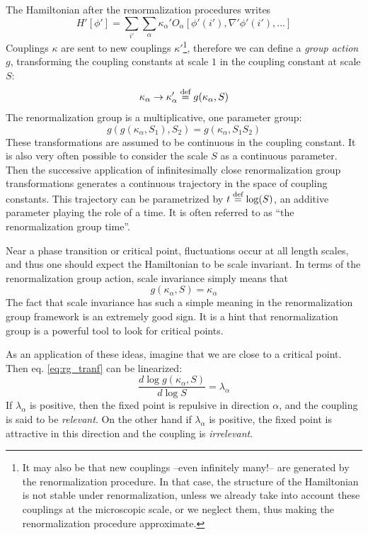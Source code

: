 The Hamiltonian after the renormalization procedures writes
\begin{equation}
H'[\phi'] = \sum_{i'} \sum_\alpha \kappa_\alpha' O_\alpha[\phi'(i'), \nabla' \phi'(i'), ...]
\end{equation}
Couplings $\kappa$ are sent to new couplings $\kappa'$\footnote{It may also be that new couplings --even infinitely many!-- are generated by the renormalization procedure. In that case, the structure of the Hamiltonian is not stable under renormalization, unless we already take into account these couplings at the microscopic scale, or we neglect them, thus making the renormalization procedure approximate.}, therefore we can define a \textit{group action} $g$, transforming the coupling constants at scale $1$ in the coupling constant at scale $S$:
\begin{equation}
\label{eq:rg_tranf}
\kappa_\alpha \rightarrow \kappa_\alpha'  \overset{\text{def}}{=}  g(\kappa_\alpha, S)
\end{equation}
The renormalization group is a multiplicative, one parameter group:
\begin{equation}
g( g(\kappa_\alpha, S_1), S_2) = g(\kappa_\alpha, S_1 S_2)
\end{equation}
These transformations are assumed to be continuous in the coupling constant. It is also very often possible to consider the scale $S$ as a continuous parameter. Then the successive application of infinitesimally close renormalization group transformations generates a continuous trajectory in the space of coupling constants. This trajectory can be parametrized by $t  \overset{\text{def}}{=}  \log(S)$, an additive parameter playing the role of a time. It is often referred to as ``the renormalization group time''.

Near a phase transition or critical point, fluctuations occur at all length scales, and thus one should expect the Hamiltonian to be scale invariant. 
In terms of the renormalization group action, scale invariance simply means that
\begin{equation}
g(\kappa_\alpha, S) = \kappa_\alpha
\end{equation}
The fact that scale invariance has such a simple meaning in the renormalization group framework is an extremely good sign. It is a hint that renormalization group is a powerful tool to look for critical points.

As an application of these ideas, imagine that we are close to a critical point. Then eq. \eqref{eq:rg_tranf} can be linearized:
\begin{equation}
\frac{d \log g(\kappa_\alpha, S)}{d \log S} = \lambda_\alpha
\end{equation}
If $\lambda_\alpha$ is positive, then the fixed point is repulsive in direction $\alpha$, and the coupling is said to be \textit{relevant}. On the other hand if $\lambda_\alpha$ is positive, the fixed point is attractive in this direction and the coupling is \textit{irrelevant}.

